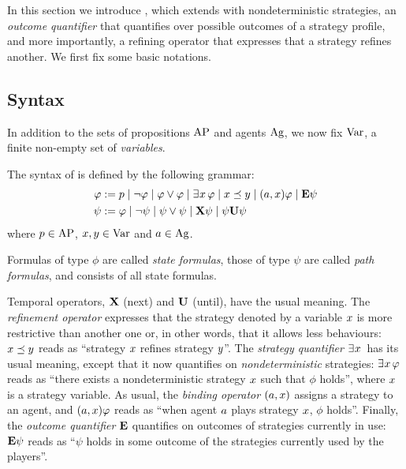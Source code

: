 
In this section we introduce \SLref, which extends \SL 
with nondeterministic strategies,  an \emph{outcome quantifier} that
quantifies over possible outcomes of a strategy profile,
and more importantly, a refining operator that expresses that a
strategy refines another.
We first fix some basic notations.



 \subsection{Syntax}
 \label{sec-SL-definition}

In addition to the sets of propositions $\textnormal{AP}$ and agents $\textnormal{Ag}$, we
now fix $\textnormal{Var}$, a finite non-empty set of \emph{variables}.



\begin{definition}%
  \label{def-SLi}
    The syntax of \SLref is defined by the following grammar:
    \begin{align*}
  \varphi:= &\; p 
  \mid \neg \varphi 
  \mid \varphi\vee\varphi 
               \mid \exists^{} x\,\varphi
               \mid x \preceq y
               \mid (a,x)\varphi
  \mid {\bf E}\psi               
      \\
      \psi:= &\; \varphi
                   \mid \neg \psi
                   \mid \psi\vee \psi
                   \mid {\bf X} \psi
                   \mid  \psi {\bf U} \psi
    \end{align*}
     where 
  $p\in\textnormal{AP}$, $x,y\in\textnormal{Var}$ and $a\in\textnormal{Ag}$.
\end{definition}

Formulas of type $\phi$ are called \emph{state formulas}, those of type $\psi$
are called \emph{path formulas}, and \SLref consists of all state formulas.


Temporal operators, ${\bf X}$ (next) and
 ${\bf U}$ (until), have the usual meaning. The \emph{refinement
   operator} expresses that the strategy denoted by a variable $x$ is more
 restrictive than another one or, in other words, that it allows less behaviours: $x\preceq y$ reads as ``strategy
 $x$ refines strategy $y$''. The  \emph{strategy
   quantifier}  $\exists^{} x\,$  has its usual meaning, except that it now
 quantifies on \emph{nondeterministic}
 strategies: $\exists^{} x\,\varphi$
 reads as ``there exists a nondeterministic
 strategy $x$
  such that $\phi$
 holds'', where $x$ is a strategy variable. 
As usual, the \emph{binding operator} $(a,x)$ assigns a strategy to an
 agent, and $(a,x)\varphi$ reads as ``when agent $a$ plays strategy $x$,
 $\phi$ holds''.
Finally, the \emph{outcome quantifier} ${\bf E}$ quantifies on
   outcomes of strategies currently in use: ${\bf E}\psi$ reads as ``$\psi$
 holds in some
 outcome of the strategies currently used by the players''.

